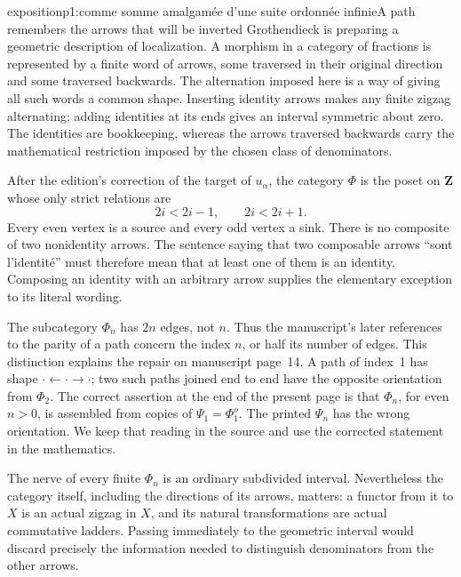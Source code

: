\begin{dcomment}{exposition}{p1:comme somme amalgamée d'une suite ordonnée infinie}{A path remembers the arrows that will be inverted}
Grothendieck is preparing a geometric description of localization. A morphism in a category of fractions is represented by a finite word of arrows, some traversed in their original direction and some traversed backwards. The alternation imposed here is a way of giving all such words a common shape. Inserting identity arrows makes any finite zigzag alternating; adding identities at its ends gives an interval symmetric about zero. The identities are bookkeeping, whereas the arrows traversed backwards carry the mathematical restriction imposed by the chosen class of denominators.

After the edition's correction of the target of $u_\alpha$, the category $\Phi$ is the poset on $\mathbf Z$ whose only strict relations are
\[
  2i<2i-1,\qquad 2i<2i+1.
\]
Every even vertex is a source and every odd vertex a sink. There is no composite of two nonidentity arrows. The sentence saying that two composable arrows ``sont l'identit\'e'' must therefore mean that at least one of them is an identity. Composing an identity with an arbitrary arrow supplies the elementary exception to its literal wording.

The subcategory $\Phi_n$ has $2n$ edges, not $n$. Thus the manuscript's later references to the parity of a path concern the index $n$, or half its number of edges. This distinction explains the repair on manuscript page~14. A path of index~1 has shape $\cdot\leftarrow\cdot\rightarrow\cdot$; two such paths joined end to end have the opposite orientation from $\Phi_2$. The correct assertion at the end of the present page is that $\Phi_n$, for even $n>0$, is assembled from copies of $\Psi_1=\Phi_1^o$. The printed $\Psi_n$ has the wrong orientation. We keep that reading in the source and use the corrected statement in the mathematics.

The nerve of every finite $\Phi_n$ is an ordinary subdivided interval. Nevertheless the category itself, including the directions of its arrows, matters: a functor from it to $X$ is an actual zigzag in $X$, and its natural transformations are actual commutative ladders. Passing immediately to the geometric interval would discard precisely the information needed to distinguish denominators from the other arrows.
\end{dcomment}

